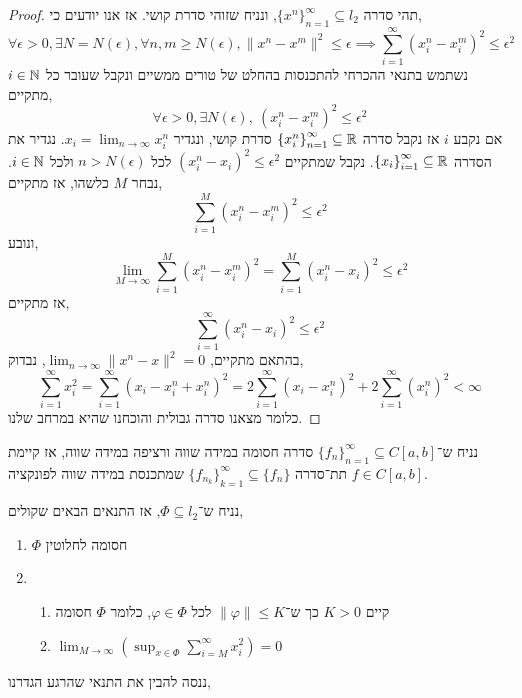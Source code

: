 \begin{proof}
	תהי סדרה ${\{ x^n \}}_{n = 1}^\infty \subseteq l_2$, ונניח שזוהי סדרת קושי.
	אז אנו יודעים כי,
	\[
		\forall \epsilon > 0, \exists N = N(\epsilon),
		\forall n, m \ge N(\epsilon), \lVert x^n - x^m \rVert^2 \le \epsilon
		\implies \sum_{i = 1}^\infty {(x_i^n - x_i^m)}^2 \le \epsilon^2
	\]
	נשתמש בתנאי ההכרחי להתכנסות בהחלט של טורים ממשיים ונקבל שעובר כל $i \in \mathbb{N}$ מתקיים,
	\[
		\forall \epsilon > 0, \exists N(\epsilon),\ 
		{(x_i^n - x_i^m)}^2 \le \epsilon^2
	\]
	אם נקבע $i$ אז נקבל סדרה ${\{ x_i^n \}}_{n = 1}^\infty \subseteq \mathbb{R}$ סדרת קושי, ונגדיר $x_i = \lim_{n \to \infty} x_i^n$.
	נגדיר את הסדרה ${\{ x_i \}}_{i = 1}^\infty \subseteq \mathbb{R}$.
	נקבל שמתקיים ${(x_i^n - x_i)}^2 \le \epsilon^2$ לכל $n > N(\epsilon)$ ולכל $i \in \mathbb{N}$.
	נבחר $M$ כלשהו, אז מתקיים,
	\[
		\sum_{i = 1}^M {(x_i^n - x_i^m)}^2 \le \epsilon^2
	\]
	ונובע,
	\[
		\lim_{M \to \infty} \sum_{i = 1}^M {(x_i^n - x_i^m)}^2
		= \sum_{i = 1}^M {(x_i^n - x_i)}^2
		\le \epsilon^2
	\]
	אז מתקיים,
	\[
		\sum_{i = 1}^\infty {(x_i^n - x_i)}^2 \le \epsilon^2
	\]
	בהתאם מתקיים, $\lim_{n \to \infty} \lVert x^n - x\rVert^2 = 0$, נבדוק,
	\[
		\sum_{i = 1}^\infty x_i^2
		= \sum_{i = 1}^\infty {(x_i - x_i^n + x_i^n)}^2
		= 2 \sum_{i = 1}^\infty {(x_i - x_i^n)}^2 + 2 \sum_{i = 1}^\infty {(x_i^n)}^2
		< \infty
	\]
	כלומר מצאנו סדרה גבולית והוכחנו שהיא במרחב שלנו.
\end{proof}
\begin{conclusion}
	נניח ש־${\{ f_n \}}_{n = 1}^\infty \subseteq C[a, b]$ סדרה חסומה במידה שווה ורציפה במידה שווה,
	אז קיימת תת־סדרה ${\{ f_{n_k} \}}_{k = 1}^\infty \subseteq \{ f_n \}$ שמתכנסת במידה שווה לפונקציה $f \in C[a, b]$.
\end{conclusion}
\begin{theorem}
	נניח ש־$\Phi \subseteq l_2$, אז התנאים הבאים שקולים,
	\begin{enumerate}
		\item $\Phi$ חסומה לחלוטין
		\item \begin{enumerate}
				\item קיים $K > 0$ כך ש־$\lVert \varphi \rVert \le K$ לכל $\varphi \in \Phi$, כלומר $\Phi$ חסומה
				\item $\lim_{M \to \infty} \left( \sup_{x \in \Phi} \sum_{i = M}^\infty x_i^2 \right) = 0$
		\end{enumerate}
	\end{enumerate}
\end{theorem}
ננסה להבין את התנאי שהרגע הגדרנו,
